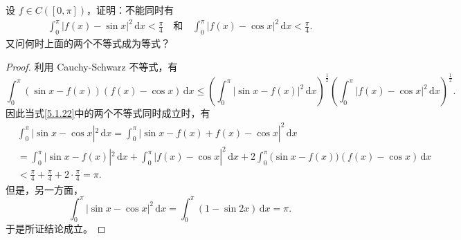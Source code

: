 \documentclass[../../main.tex]{subfiles}%
\begin{document}
\begin{example}
设 \( f \in C([0,\pi]) \)，证明：不能同时有
\begin{align}
\int_{0}^{\pi} |f(x) - \sin x|^2 \, \mathrm{d}x < \frac{\pi}{4}
\quad \text{和} \quad
\int_{0}^{\pi} |f(x) - \cos x|^2 \, \mathrm{d}x < \frac{\pi}{4}. \label{5.1.22}
\end{align}
又问何时上面的两个不等式成为等式？
\end{example}
\begin{proof}
利用 Cauchy-Schwarz 不等式，有
\[
\int_{0}^{\pi} (\sin x - f(x))(f(x) - \cos x) \, \mathrm{d}x
\leqslant \left( \int_{0}^{\pi} |\sin x - f(x)|^2 \, \mathrm{d}x \right)^{\frac{1}{2}} \left( \int_{0}^{\pi} |f(x) - \cos x|^2 \, \mathrm{d}x \right)^{\frac{1}{2}}.
\]
因此当式\eqref{5.1.22}中的两个不等式同时成立时，有
\begin{align*}
&\int_0^{\pi}{|\sin x}-\cos x|^2\,\mathrm{d}x=\int_0^{\pi}{|\sin x}-f(x)+f(x)-\cos x|^2\,\mathrm{d}x
\\
&=\int_0^{\pi}{|\sin x}-f(x)|^2\,\mathrm{d}x+\int_0^{\pi}{|f(x)}-\cos x|^2\,\mathrm{d}x+2\int_0^{\pi}{(\sin x}-f(x))(f(x)-\cos x)\,\mathrm{d}x
\\
&<\frac{\pi}{4}+\frac{\pi}{4}+2\cdot \frac{\pi}{4}=\pi .
\end{align*}
但是，另一方面，
\[
\int_{0}^{\pi} |\sin x - \cos x|^2 \, \mathrm{d}x = \int_{0}^{\pi} (1 - \sin 2x) \, \mathrm{d}x = \pi.
\]
于是所证结论成立。


\end{proof}
\end{document}
